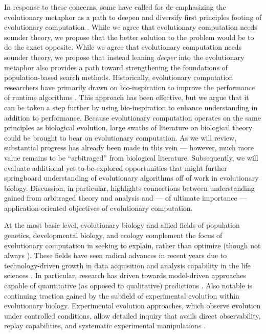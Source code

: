 In response to these concerns, some have called for de-emphasizing the evolutionary metaphor as a path to deepen and diversify first principles footing of evolutionary computation \citep{moore2023evolution}.
While we agree that evolutionary computation needs sounder theory, we propose that the better solution to the problem would be to do the exact opposite.
While we agree that evolutionary computation needs sounder theory, we propose that instead leaning \textit{deeper} into the evolutionary metaphor also provides a path toward strengthening the foundations of population-based search methods.
Historically, evolutionary computation researchers have primarily drawn on bio-inspiration to improve the performance of runtime algorithms \citep{banzhaf2006artificial,kumar2003biologically,mcphee2009developmental}.
This approach has been effective, but we argue that it can be taken a step further by using bio-inspiration to enhance understanding in addition to performance.
Because evolutionary computation operates on the same principles as biological evolution, large swaths of literature on biological theory could be brought to bear on evolutionary computation.
As we will review, substantial progress has already been made in this vein --- however, much more value remains to be ``arbitraged'' from biological literature.
Subsequently, we will evaluate additional yet-to-be-explored opportunities that might further springboard understanding of evolutionary algorithms off of work in evolutionary biology.
Discussion, in particular, highlights connections between understanding gained from arbitraged theory and analysis and --- of ultimate importance --- application-oriented objectives of evolutionary computation.

At the most basic level, evolutionary biology and allied fields of population genetics, developmental biology, and ecology complement the focus of evolutionary computation in seeking to explain, rather than optimize (though not always \citep{cobb2013directed,carroll2014applying}).
These fields have seen radical advances in recent years due to technology-driven growth in data acquisition and analysis capability in the life sciences \citep{TODO}.
In particular, research has driven towards model-driven approaches capable of quantitative (as opposed to qualitative) predictions \citep{TODO}.
Also notable is continuing traction gained by the subfield of experimental evolution within evolutionary biology.
Experimental evolution approaches, which observe evolution under controlled conditions, allow detailed inquiry that avails direct observability, replay capabilities, and systematic experimental manipulations \citep{kawecki2012experimental}.

